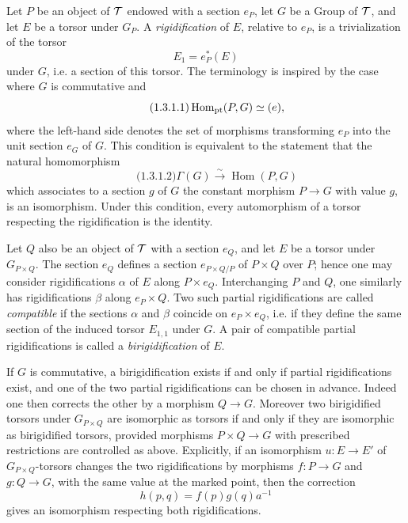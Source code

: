 \documentclass[11pt]{article}
\begin{document}
Let \(P\) be an object of \(\mathcal T\) endowed with a section \(e_P\), let \(G\) be a Group of \(\mathcal T\), and let \(E\) be a torsor under \(G_P\).  A \emph{rigidification} of \(E\), relative to \(e_P\), is a trivialization of the torsor
\[
  E_1=e_P^*(E)
\]
under \(G\), i.e. a section of this torsor.  The terminology is inspired by the case where \(G\) is commutative and
\begin{equation}\qquad\text{(1.3.1.1)}
  \operatorname{Hom}_{\mathrm{pt}}(P,G)\simeq (e),
\end{equation}
where the left-hand side denotes the set of morphisms transforming \(e_P\) into the unit section \(e_G\) of \(G\).  This condition is equivalent to the statement that the natural homomorphism
\begin{equation}\qquad\text{(1.3.1.2)}
  \Gamma(G)\xrightarrow{\sim}\operatorname{Hom}(P,G)
\end{equation}
which associates to a section \(g\) of \(G\) the constant morphism \(P\to G\) with value \(g\), is an isomorphism.  Under this condition, every automorphism of a torsor respecting the rigidification is the identity.

Let \(Q\) also be an object of \(\mathcal T\) with a section \(e_Q\), and let \(E\) be a torsor under \(G_{P\times Q}\).  The section \(e_Q\) defines a section \(e_{P\times Q/P}\) of \(P\times Q\) over \(P\); hence one may consider rigidifications \(\alpha\) of \(E\) along \(P\times e_Q\).  Interchanging \(P\) and \(Q\), one similarly has rigidifications \(\beta\) along \(e_P\times Q\).  Two such partial rigidifications are called \emph{compatible} if the sections \(\alpha\) and \(\beta\) coincide on \(e_P\times e_Q\), i.e. if they define the same section of the induced torsor \(E_{1,1}\) under \(G\).  A pair of compatible partial rigidifications is called a \emph{birigidification} of \(E\).

If \(G\) is commutative, a birigidification exists if and only if partial rigidifications exist, and one of the two partial rigidifications can be chosen in advance.  Indeed one then corrects the other by a morphism \(Q\to G\).  Moreover two birigidified torsors under \(G_{P\times Q}\) are isomorphic as torsors if and only if they are isomorphic as birigidified torsors, provided morphisms \(P\times Q\to G\) with prescribed restrictions are controlled as above.  Explicitly, if an isomorphism \(u:E\to E'\) of \(G_{P\times Q}\)-torsors changes the two rigidifications by morphisms \(f:P\to G\) and \(g:Q\to G\), with the same value at the marked point, then the correction
\[
  h(p,q)=f(p)g(q)a^{-1}
\]
gives an isomorphism respecting both rigidifications.
\end{document}
